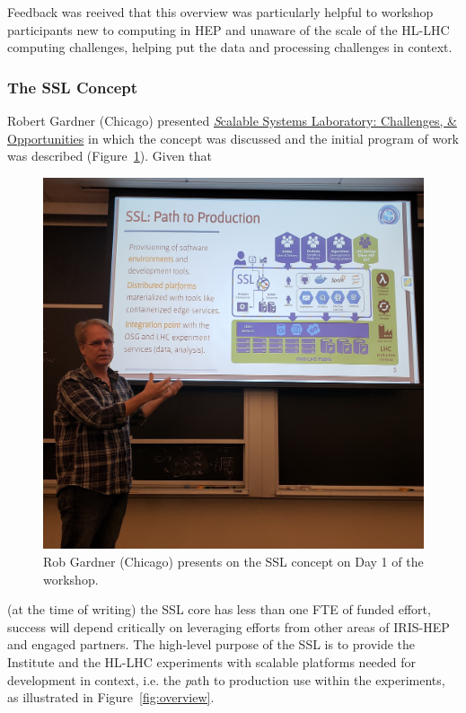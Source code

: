 \documentclass[11pt,letterpaper,fleqn]{article}
\begin{document}
Feedback was reeived that this overview was particularly helpful to workshop participants new to computing in HEP and unaware of the scale of the HL-LHC computing challenges, helping put the data and processing challenges in context.

\subsubsection{The SSL Concept}
\vspace{0.2cm}
Robert Gardner (Chicago) presented \href{https://indico.cern.ch/event/820946/contributions/3461590/attachments/1866979/3070394/2019.06.21_SSL_Overview_Rob.pdf}{\textit Scalable Systems Laboratory: Challenges, \& Opportunities} in which the concept was discussed and the initial program of work was described (Figure~\ref{fig:rwg_ssl}). Given that
\begin{figure}
  \vspace{-0.4cm}
  \includegraphics[width=0.99\linewidth]{figures/rwg_ssl.jpg}
  \vspace{-0.7cm}
  \caption{Rob Gardner (Chicago) presents on the SSL concept on Day 1 of the workshop.}
  \label{fig:rwg_ssl}
\end{figure}
(at the time of writing) the SSL core has less than one FTE of funded effort, success will depend critically on leveraging efforts from other areas of IRIS-HEP and engaged partners. The high-level purpose of the SSL is to provide the Institute and the HL-LHC experiments with scalable platforms needed for development in context, i.e. the {\textit path to production} use within the experiments, as illustrated in Figure~\ref{fig:overview}.
\end{document}
